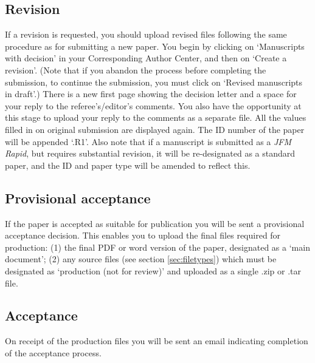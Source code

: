 \documentclass{jfm}
\begin{document}
\subsection{Revision}
If a revision is requested, you should upload revised files following the same procedure as for submitting a new paper. You begin by clicking on `Manuscripts with decision' in your Corresponding Author Center, and then on `Create a revision'. (Note that if you abandon the process before completing the submission, to continue the submission, you must click on `Revised manuscripts in draft'.) There is a new first page showing the decision letter and a space for your reply to the referee's/editor's comments. You also have the opportunity at this stage to upload your reply to the comments as a separate file. All the values filled in on original submission are displayed again. The ID number of the paper will be appended `.R1'. Also note that if a manuscript is submitted as a {\it JFM Rapid}, but requires substantial revision, it will be re-designated as a standard paper, and the ID and paper type will be amended to reflect this.

\subsection{Provisional acceptance}
If the paper is accepted as suitable for publication you will be sent a provisional acceptance decision. This enables you to upload the final files required for production:
(1) the final PDF or word version of the paper, designated as a `main document';
(2) any source files (see section \ref{sec:filetypes}) which must be designated as `production (not for review)' and uploaded as a single .zip or .tar file.

\subsection{Acceptance}
On receipt of the production files you will be sent an email indicating completion of the acceptance process.
\end{document}
